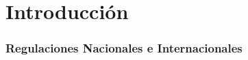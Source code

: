 \chapter{Introducción}
\label{chap:introduccion}


\subsection{Regulaciones Nacionales e Internacionales}